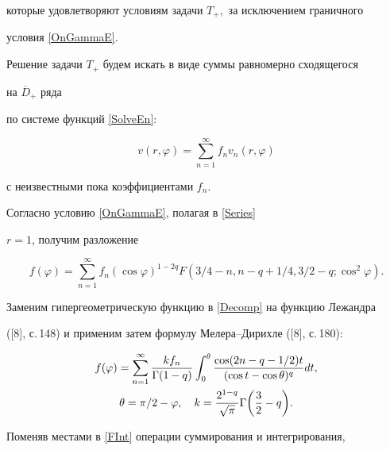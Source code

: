 которые удовлетворяют условиям задачи $T_+,$ за исключением граничного 


условия \eqref{OnGammaE}.





Решение задачи $T_+$ будем искать в виде суммы равномерно сходящегося 


на $\overline{D}_+$ ряда


по системе функций \eqref{SolveEn}:


\begin{equation}\label{Series}


v(r,\varphi)=\sum\limits_{n=1}^\infty f_n v_n(r,\varphi)


\end{equation}


с неизвестными пока коэффициентами $f_n$.





Согласно условию \eqref{OnGammaE}, полагая в \eqref{Series}


$r=1$, получим разложение


\begin{equation}\label{Decomp}


f(\varphi)=\sum_{n=1}^\infty f_n (\cos\varphi)^{1-2q}


F({3/4-n},{n-q+1/4},{3/2-q};{\cos^2\varphi}).


\end{equation}


Заменим гипергеометрическую функцию в \eqref{Decomp} на функцию Лежандра


([8], с.\,148) и применим затем формулу Мелера--Дирихле ([8], с.\,180):


\begin{gather}\label{FInt}


f(\varphi)=\sum\limits_{n=1}^\infty


\frac{kf_n}{\Gamma(1-q)} \int_0^\theta


\frac{\cos(2n-q-1/2)t}{(\cos t- \cos \theta)^{q}} dt,\\ 


%


\theta=\pi/2-\varphi, \quad k=\frac{2^{1-q}}{\sqrt{\pi}}\Gamma


\bigg(\frac{3}{2}-q\bigg).\notag


\end{gather}


Поменяв местами в \eqref{FInt} операции суммирования и интегрирования, 


